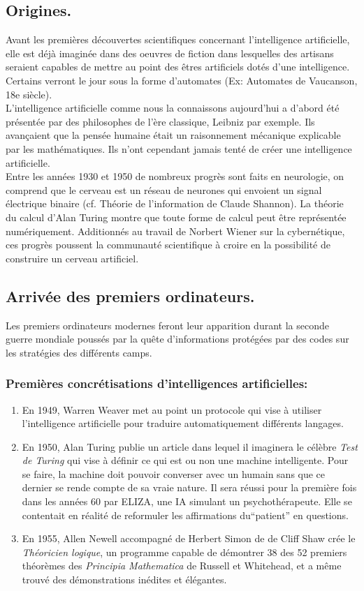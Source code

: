 \documentclass[a4paper, 12pt]{article}
\numberwithin{equation}{subsection}
\begin{document}
\subsection{Origines.}
Avant les premières découvertes scientifiques concernant l'intelligence artificielle, elle est déjà imaginée dans des oeuvres de fiction dans lesquelles des artisans seraient capables de mettre au point des êtres artificiels dotés d'une intelligence. Certains verront le jour sous la forme d'automates (Ex: Automates de Vaucanson, 18e siècle).\\

L'intelligence artificielle comme nous la connaissons aujourd'hui a d'abord été présentée par des philosophes de l'ère classique, Leibniz par exemple. Ils avançaient que la pensée humaine était un raisonnement mécanique explicable par les mathématiques. Ils n'ont cependant jamais tenté de créer une intelligence artificielle.\\

Entre les années 1930 et 1950 de nombreux progrès sont faits en neurologie, on comprend que le cerveau est un réseau de neurones qui envoient un signal électrique binaire (cf. Théorie de l'information de Claude Shannon). La théorie du calcul d'Alan Turing montre que toute forme de calcul peut être représentée numériquement. Additionnés au travail de Norbert Wiener sur la cybernétique, ces progrès poussent la communauté scientifique à croire en la possibilité de construire un cerveau artificiel.
\subsection{Arrivée des premiers ordinateurs.}
Les premiers ordinateurs modernes feront leur apparition durant la seconde guerre mondiale poussés par la quête d'informations protégées par des codes sur les stratégies des différents camps.
\subsubsection{Premières concrétisations d'intelligences artificielles:}
\begin{enumerate}
  \item En 1949, Warren Weaver met au point un protocole qui vise à utiliser l'intelligence artificielle pour traduire automatiquement différents langages.
  \item En 1950, Alan Turing publie un article dans lequel il imaginera le célèbre \textit{Test de Turing} qui vise à définir ce qui est ou non une machine intelligente. Pour se faire, la machine doit pouvoir converser avec un humain sans que ce dernier se rende compte de sa vraie nature. Il sera réussi pour la première fois dans les années 60 par ELIZA, une IA simulant un psychothérapeute. Elle se contentait en réalité de reformuler les affirmations du``patient'' en questions.
  \item En 1955, Allen Newell accompagné de Herbert Simon de de Cliff Shaw crée le \textit{Théoricien logique}, un programme capable de démontrer 38 des 52 premiers théorèmes des \textit{Principia Mathematica} de Russell et Whitehead, et a même trouvé des démonstrations inédites et élégantes.
\end{enumerate}
\end{document}

